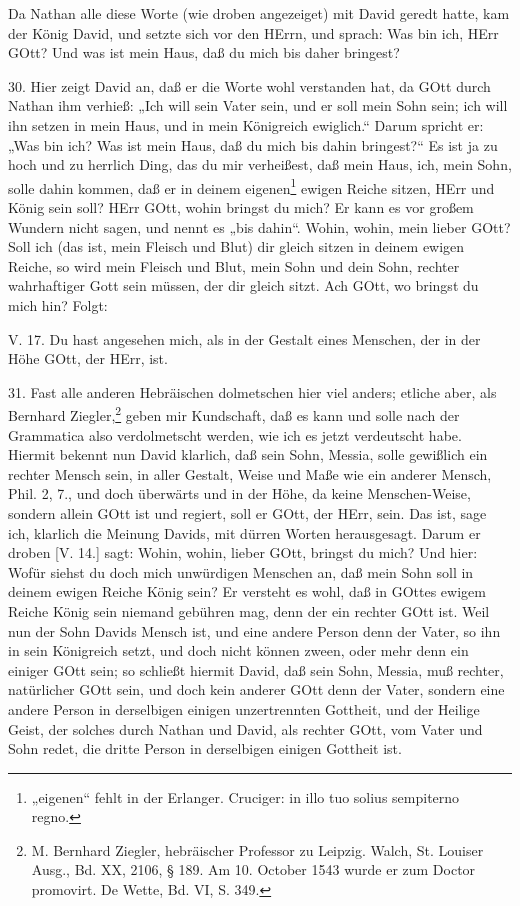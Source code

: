 Da Nathan alle diese Worte (wie droben angezeiget) mit David geredt hatte, kam der König David, und setzte sich vor den HErrn, und sprach: Was bin ich, HErr GOtt? Und was ist mein Haus, daß du mich bis daher bringest?

30. Hier zeigt David an, daß er die Worte wohl verstanden hat, da GOtt durch Nathan ihm verhieß: „Ich will sein Vater sein, und er soll mein Sohn sein; ich will ihn setzen in mein Haus, und in mein Königreich ewiglich.“ Darum spricht er: „Was bin ich? Was ist mein Haus, daß du mich bis dahin bringest?“ Es ist ja zu hoch und zu herrlich Ding, das du mir verheißest, daß mein Haus, ich, mein Sohn, solle dahin kommen, daß er in deinem eigenen\footnote{„eigenen“ fehlt in der Erlanger. Cruciger: in illo tuo solius sempiterno regno.} ewigen Reiche sitzen, HErr und König sein soll? HErr GOtt, wohin bringst du mich? Er kann es vor großem Wundern nicht sagen, und nennt es „bis dahin“. Wohin, wohin, mein lieber GOtt? Soll ich (das ist, mein Fleisch und Blut) dir gleich sitzen in deinem ewigen Reiche, so wird mein Fleisch und Blut, mein Sohn und dein Sohn, rechter wahrhaftiger Gott sein müssen, der dir gleich sitzt. Ach GOtt, wo bringst du mich hin? Folgt:

\begin{schriftzitat}
V. 17. Du hast angesehen mich, als in der Gestalt eines Menschen, der in der Höhe GOtt, der HErr, ist.
\end{schriftzitat}

31. Fast alle anderen Hebräischen dolmetschen hier viel anders; etliche aber, als Bernhard Ziegler,\footnote{M. Bernhard Ziegler, hebräischer Professor zu Leipzig. Walch, St. Louiser Ausg., Bd. XX, 2106, § 189. Am 10. October 1543 wurde er zum Doctor promovirt. De Wette, Bd. VI, S. 349.} geben mir Kundschaft, daß es kann
und solle nach der Grammatica also verdolmetscht werden, wie ich es jetzt verdeutscht habe. Hiermit bekennt nun David klarlich, daß sein Sohn, Messia, solle gewißlich ein rechter Mensch sein, in aller Gestalt, Weise und Maße wie ein anderer Mensch, Phil. 2, 7., und doch überwärts und in der Höhe, da keine Menschen-Weise, sondern allein GOtt ist und regiert, soll er GOtt, der HErr, sein. Das ist, sage ich, klarlich die Meinung Davids, mit dürren Worten herausgesagt. Darum er droben [V. 14.] sagt: Wohin, wohin, lieber GOtt, bringst du mich? Und hier: Wofür siehst du doch mich unwürdigen Menschen an, daß mein Sohn soll in deinem ewigen Reiche König sein? Er versteht es wohl, daß in GOttes ewigem Reiche König sein niemand gebühren mag, denn der ein rechter GOtt ist. Weil nun der Sohn Davids Mensch ist, und eine andere Person denn der Vater, so ihn in sein Königreich setzt, und doch nicht können zween, oder mehr denn ein einiger GOtt sein; so schließt hiermit David, daß sein Sohn, Messia, muß rechter, natürlicher GOtt sein, und doch kein anderer GOtt denn der Vater, sondern eine andere Person in derselbigen einigen unzertrennten Gottheit, und der Heilige Geist, der solches durch Nathan und David, als rechter GOtt, vom Vater und Sohn redet, die dritte Person in derselbigen einigen Gottheit ist.


